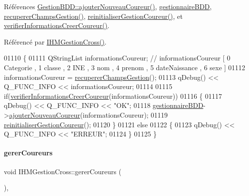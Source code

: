 Références \hyperlink{class_gestion_b_d_d_ae71561eea6d1163ff067f079ccc6d169}{Gestion\+B\+D\+D\+::ajouter\+Nouveau\+Coureur()}, \hyperlink{class_i_h_m_gestion_cross_a440bac63a3e51db3e2c08e883f8cafc9}{gestionnaire\+B\+DD}, \hyperlink{class_i_h_m_gestion_cross_a271efe8d31fbe05fccfb2dc81e71971a}{recuperer\+Champs\+Gestion()}, \hyperlink{class_i_h_m_gestion_cross_a85c44933ec0dcbb591e01c832063367e}{reinitialiser\+Gestion\+Coureur()}, et \hyperlink{class_i_h_m_gestion_cross_ae08eec25f5a6d33bf133b0cee78c7c5c}{verifier\+Informations\+Creer\+Coureur()}.



Référencé par \hyperlink{class_i_h_m_gestion_cross_a2c62fd83326a87456a403f46acc408c8}{I\+H\+M\+Gestion\+Cross()}.


\begin{DoxyCode}
01110 \{
01111     QStringList informationsCoureur; \textcolor{comment}{// informationsCoureur [ 0 Categorie , 1 classe , 2 INE , 3 nom ,  4
       prenom , 5 dateNaissance , 6 sexe ]}
01112     informationsCoureur = \hyperlink{class_i_h_m_gestion_cross_a271efe8d31fbe05fccfb2dc81e71971a}{recupererChampsGestion}();
01113     qDebug() << Q\_FUNC\_INFO << informationsCoureur;
01114 
01115     \textcolor{keywordflow}{if}(\hyperlink{class_i_h_m_gestion_cross_ae08eec25f5a6d33bf133b0cee78c7c5c}{verifierInformationsCreerCoureur}(informationsCoureur))
01116     \{
01117         qDebug() << Q\_FUNC\_INFO << \textcolor{stringliteral}{"OK"};
01118         \hyperlink{class_i_h_m_gestion_cross_a440bac63a3e51db3e2c08e883f8cafc9}{gestionnaireBDD}->\hyperlink{class_gestion_b_d_d_ae71561eea6d1163ff067f079ccc6d169}{ajouterNouveauCoureur}(informationsCoureur);
01119         \hyperlink{class_i_h_m_gestion_cross_a85c44933ec0dcbb591e01c832063367e}{reinitialiserGestionCoureur}();
01120     \}
01121     \textcolor{keywordflow}{else}
01122     \{
01123         qDebug() << Q\_FUNC\_INFO << \textcolor{stringliteral}{"ERREUR"};
01124     \}
01125 \}
\end{DoxyCode}
\mbox{\label{class_i_h_m_gestion_cross_ad46a2295500cf98dbc18f862f6020103}} 
\paragraph{\texorpdfstring{gerer\+Coureurs}{gererCoureurs}}
{\footnotesize\ttfamily void I\+H\+M\+Gestion\+Cross\+::gerer\+Coureurs (\begin{DoxyParamCaption}{ }\end{DoxyParamCaption})\hspace{0.3cm}{\ttfamily [private]}, {\ttfamily [slot]}}



